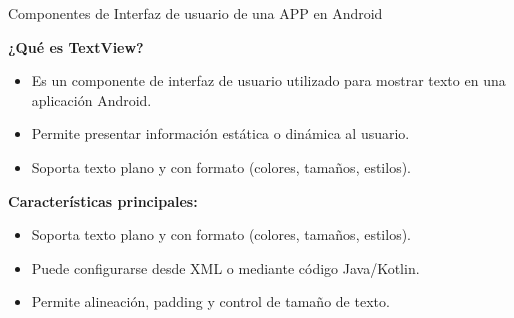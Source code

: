 \documentclass[aspectratio=169,compress]{beamer}
\begin{document}
\begin{frame}{Componentes de Interfaz de usuario de una APP en Android}


\textbf{¿Qué es TextView?} 
\begin{itemize} 
\item Es un componente de interfaz de usuario utilizado para mostrar texto en una aplicación Android. 
\item Permite presentar información estática o dinámica al usuario. 
\item Soporta texto plano y con formato (colores, tamaños, estilos).
\end{itemize} 

\textbf{Características principales:} 
\begin{itemize} 
\item Soporta texto plano y con formato (colores, tamaños, estilos). 
\item Puede configurarse desde XML o mediante código Java/Kotlin. 
\item Permite alineación, padding y control de tamaño de texto. 
\end{itemize}

\end{frame}
\end{document}
